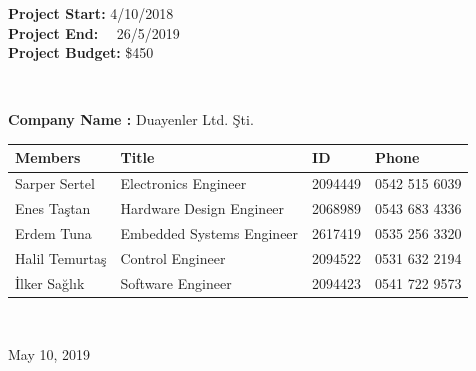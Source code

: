 \documentclass[a4paper,12pt]{article}
\begin{document}
\begin{titlepage}
\begin{minipage}[r]{0.35\textwidth}
\textbf{Project Start:} 4/10/2018\\

\textbf{Project End:} \ \  26/5/2019\\

\textbf{Project Budget:} \$450


\end{minipage}\\[1cm]

\begin{minipage}{\textwidth}

\begin{flushleft}

\large{\textbf{Company Name :}}	Duayenler Ltd. Şti.\\

\begin{table}[H]

\begin{tabular}{l l l l}

\hline

\textbf{Members} & \textbf{Title}            & \textbf{ID} & \textbf{Phone} \\ \hline

Sarper Sertel    & Electronics Engineer      & 2094449     & 0542 515 6039  \\ 

Enes Taştan     & Hardware Design Engineer  & 2068989     & 0543 683 4336  \\ 

Erdem Tuna       & Embedded Systems Engineer & 2617419     & 0535 256 3320  \\ 

Halil Temurtaş  & Control Engineer          & 2094522     & 0531 632 2194  \\

İlker Sağlık  & Software Engineer         & 2094423     & 0541 722 9573  \\ \hline



\end{tabular}

\end{table}

\end{flushleft}

\end{minipage}\\[1cm]


\begin{flushbottom}

{\large May 10, 2019} %

\end{flushbottom}


\end{titlepage}
\end{document}
